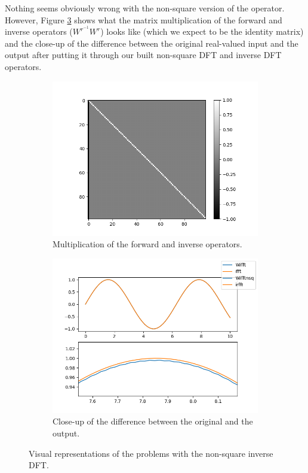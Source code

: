 \documentclass{article}
\begin{document}
Nothing seems obviously wrong with the non-square version of the operator.
However, Figure \ref{fig:problems} shows what the matrix multiplication of the forward and inverse operators ($W^{r^{-1}}W^r$) looks like (which we expect to be the identity matrix) and the close-up of the difference between the original real-valued input and the output after putting it through our built non-square DFT and inverse DFT operators.

\begin{figure}[ht]
	\centering
	\begin{subfigure}{.45\textwidth}
	  \centering
	  \includegraphics[width=\linewidth]{Figures/multiplied.png}
	  \caption{Multiplication of the forward and inverse operators.}
	  \label{fig:problems-multiplication}
	\end{subfigure}
	\begin{subfigure}{.45\textwidth}
	  \centering
	  \includegraphics[width=\linewidth]{Figures/bumps.png}
	  \caption{Close-up of the difference between the original and the output.}
	  \label{fig:problems-closeup}
	\end{subfigure}
	\caption{Visual representations of the problems with the non-square inverse DFT.}
	\label{fig:problems}
\end{figure}
\end{document}
